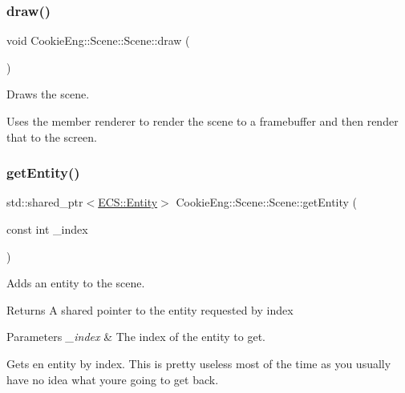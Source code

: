 \subsubsection{\texorpdfstring{draw()}{draw()}}
{\footnotesize\ttfamily void Cookie\+Eng\+::\+Scene\+::\+Scene\+::draw (\begin{DoxyParamCaption}{ }\end{DoxyParamCaption})}



Draws the scene. 

Uses the member renderer to render the scene to a framebuffer and then render that to the screen. \mbox{\label{class_cookie_eng_1_1_scene_1_1_scene_a4287243abfe6016c8c819aebc090bf4c}} 
\subsubsection{\texorpdfstring{get\+Entity()}{getEntity()}}
{\footnotesize\ttfamily std\+::shared\+\_\+ptr$<$\hyperlink{class_cookie_eng_1_1_e_c_s_1_1_entity}{E\+C\+S\+::\+Entity}$>$ Cookie\+Eng\+::\+Scene\+::\+Scene\+::get\+Entity (\begin{DoxyParamCaption}\item[{const int}]{\+\_\+index }\end{DoxyParamCaption})}



Adds an entity to the scene. 

\begin{DoxyReturn}{Returns}
A shared pointer to the entity requested by index 
\end{DoxyReturn}

\begin{DoxyParams}{Parameters}
{\em \+\_\+index} & The index of the entity to get.\\
\hline
\end{DoxyParams}
Gets en entity by index. This is pretty useless most of the time as you usually have no idea what you\textquotesingle{}re going to get back. \mbox{\label{class_cookie_eng_1_1_scene_1_1_scene_af8468e3788c5f9a8696aa4deac8c62a3}} 
